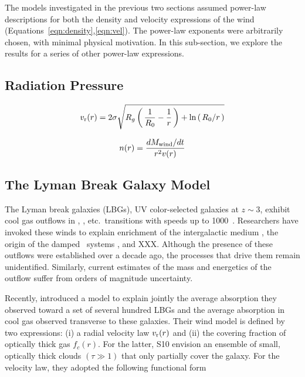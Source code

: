 \documentclass[12pt,preprint]{aastex}
\begin{document}
The models investigated in the previous two sections
assumed power-law descriptions for both the density and velocity
expressions of the wind (Equations~\ref{eqn:density},\ref{eqn:vel}).
The power-law exponents were arbitrarily chosen, with minimal physical
motivation.  In this sub-section, we explore the results for a series
of other power-law expressions.

\subsection{Radiation Pressure}

\begin{equation}
v_{\rm r}(r) = 2\sigma \sqrt{R_g \left ( \, \frac{1}{R_0} - \frac{1}{r} \, \right )
   + \ln\left ( \, R_0/r \, \right ) }
\end{equation}

\begin{equation}
n(r) = \frac{dM_{\rm wind}/dt}{r^2 v(r)}
\end{equation}

\subsection{The Lyman Break Galaxy Model}
\label{sec:lbg}

The Lyman break galaxies (LBGs), UV color-selected galaxies at $z \sim 3$,
exhibit cool gas outflows in , ,
etc.\ transitions with speeds up to 1000\kms\
\citep[e.g.][]{lkg+97,pks+98,steidel+10}.
Researchers have invoked these winds to explain enrichment of
the intergalactic medium \citep[e.g.][]{aguirre,spa+06}, the origin of the
damped \lya\ systems \citep{nbf98,schaye01a}, and XXX.  Although the
presence of these outflows were established over a decade ago,
the processes that drive them remain
unidentified.  Similarly,  current estimates of the mass and energetics of the
outflow suffer from orders of magnitude uncertainty.

Recently, \cite[][; hereafter S10]{steidel+10} introduced a model to
explain jointly the average absorption they observed
toward a set of several hundred LBGs and the average absorption in cool gas
observed transverse to these galaxies.  
Their wind model is defined by two
expressions: (i) a radial velocity law $v_{\rm r}(r)$ and (ii) the covering
fraction of optically thick gas $f_c(r)$.  For the latter, S10
envision an 
ensemble of small, optically thick clouds $(\tau \gg 1)$ that only
partially cover the galaxy.
For the velocity law, they adopted the following functional
form
\end{document}
